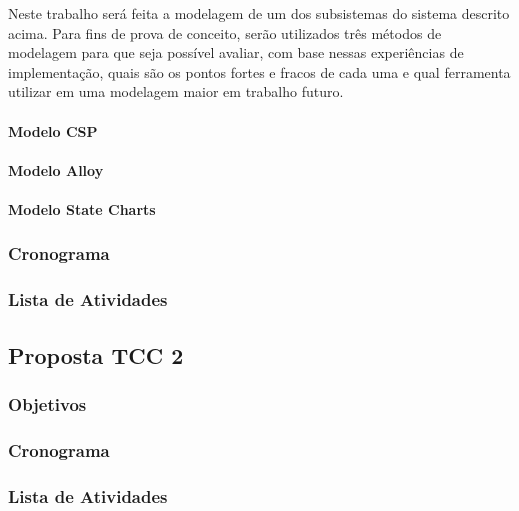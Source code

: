 Neste trabalho será feita a modelagem de um dos subsistemas do sistema descrito acima.
Para fins de prova de conceito, serão utilizados três métodos de modelagem para que seja possível avaliar,
com base nessas experiências de implementação, quais são os pontos fortes e fracos de cada uma e qual ferramenta
utilizar em uma modelagem maior em trabalho futuro.
\paragraph{Modelo CSP}
\paragraph{Modelo Alloy}
\paragraph{Modelo State Charts}

\subsubsection{Cronograma}
\subsubsection{Lista de Atividades}


\subsection{Proposta TCC 2}
\subsubsection{Objetivos}
\subsubsection{Cronograma}
\subsubsection{Lista de Atividades}

